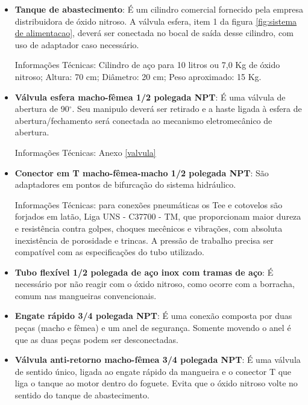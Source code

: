 \begin{itemize}

    \item \textbf{Tanque de abastecimento}: É um cilindro comercial fornecido pela empresa distribuidora de óxido nitroso. A válvula esfera, item 1 da figura \ref{fig:sistema de alimentacao}, deverá ser conectada no bocal de saída desse cilindro, com uso de adaptador caso necessário.
    \par Informações Técnicas: Cilindro de aço para 10 litros ou 7,0 Kg de óxido nitroso; Altura: 70 cm;    Diâmetro: 20 cm; Peso aproximado: 15 Kg.
    
    \item \textbf{Válvula esfera macho-fêmea 1/2 polegada NPT}: É uma válvula de abertura de 90$^{\circ}$. Seu manipulo deverá ser retirado e a haste ligada à esfera de abertura/fechamento será conectada ao mecanismo eletromecânico de abertura. 
     \par Informações Técnicas: Anexo \ref{valvula}
    
    \item \textbf{Conector em T macho-fêmea-macho 1/2 polegada NPT}: São adaptadores em pontos de bifurcação do sistema hidráulico.
    \par Informações Técnicas: para conexões pneumáticas os Tee e cotovelos são forjados em latão, Liga UNS - C37700 - TM, que proporcionam maior dureza e resistência contra golpes, choques mecênicos e vibrações, com absoluta inexistência de porosidade e trincas. A pressão de trabalho precisa ser compatível com as especificações do tubo utilizado.
    
    \item \textbf{Tubo flexível 1/2 polegada de aço inox com tramas de aço}: É necessário por não reagir com o óxido nitroso, como ocorre com a borracha, comum nas mangueiras convencionais.
    
    \item \textbf{Engate rápido 3/4 polegada NPT}: É uma conexão composta por duas peças (macho e fêmea) e um anel de segurança. Somente movendo o anel é que as duas peças podem ser desconectadas.
    
    \item \textbf{Válvula anti-retorno macho-fêmea 3/4 polegada NPT}: É uma válvula de sentido único, ligada ao engate rápido da mangueira e o conector T que liga o tanque ao motor dentro do foguete. Evita que o óxido nitroso volte no sentido do tanque de abastecimento.
    
\end{itemize}   

